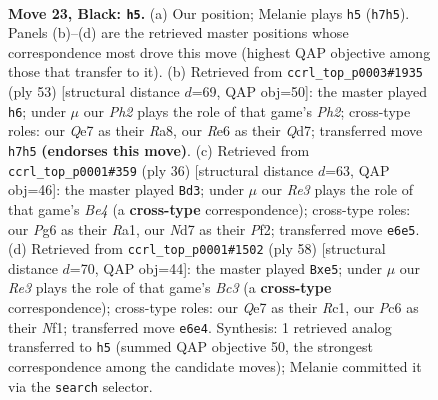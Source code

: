 \documentclass[11pt]{article}
\begin{document}
\clearpage

\begin{figure}[p]\centering
\begin{subfigure}{0.46\textwidth}\centering
\resizebox{\linewidth}{!}{%
\newchessgame
\chessboard[
  setfen={r1b5/pp1nq1kp/2p1r1p1/6p1/2BPN3/5PP1/PP5P/2RQR1K1 b - - 2 23},
  showmover=false,
  pgfstyle=straightmove, color=movearrow, markmove={h7-h5}
]}
\caption{}
\end{subfigure}\hfill
\begin{subfigure}{0.46\textwidth}\centering
\resizebox{\linewidth}{!}{%
\newchessgame
\chessboard[
  setfen={r5k1/3q2pp/pBNp4/3Pp1b1/Q3P2r/7n/1PP4P/1K2R2R b - - 4 27},
  showmover=false,
  pgfstyle=straightmove, color=movearrow, markmove={h7-h6}
]}
\caption{}
\end{subfigure}
\\[4pt]
\begin{subfigure}{0.46\textwidth}\centering
\resizebox{\linewidth}{!}{%
\newchessgame
\chessboard[
  setfen={r4r1k/p1q2pp1/b1n1p2p/2p5/P3B3/2P1PNP1/2Q2PP1/R4RK1 w - - 6 19},
  showmover=false,
  pgfstyle=straightmove, color=movearrow, markmove={e4-d3}
]}
\caption{}
\end{subfigure}\hfill
\begin{subfigure}{0.46\textwidth}\centering
\resizebox{\linewidth}{!}{%
\newchessgame
\chessboard[
  setfen={3rr1k1/pp4p1/3bq2p/4np2/4p3/P1B1P2P/1P2QPP1/2RR1NK1 w - - 2 30},
  showmover=false,
  pgfstyle=straightmove, color=movearrow, markmove={c3-e5}
]}
\caption{}
\end{subfigure}
\caption{\textbf{Move 23, Black: \texttt{h5}.} (a) Our position; Melanie plays \texttt{h5} (\texttt{h7h5}). Panels (b)--(d) are the retrieved master positions whose correspondence most drove this move (highest QAP objective among those that transfer to it). (b) Retrieved from \texttt{ccrl\_top\_p0003\#1935} (ply 53) [structural distance $d$=69, QAP obj=50]: the master played \texttt{h6}; under $\mu$ our \emph{Ph2} plays the role of that game's \emph{Ph2}; cross-type roles: our \emph{Q}e7 as their \emph{R}a8, our \emph{R}e6 as their \emph{Q}d7; transferred move \texttt{h7h5} \textbf{(endorses this move)}. (c) Retrieved from \texttt{ccrl\_top\_p0001\#359} (ply 36) [structural distance $d$=63, QAP obj=46]: the master played \texttt{Bd3}; under $\mu$ our \emph{Re3} plays the role of that game's \emph{Be4} (a \textbf{cross-type} correspondence); cross-type roles: our \emph{P}g6 as their \emph{R}a1, our \emph{N}d7 as their \emph{P}f2; transferred move \texttt{e6e5}. (d) Retrieved from \texttt{ccrl\_top\_p0001\#1502} (ply 58) [structural distance $d$=70, QAP obj=44]: the master played \texttt{Bxe5}; under $\mu$ our \emph{Re3} plays the role of that game's \emph{Bc3} (a \textbf{cross-type} correspondence); cross-type roles: our \emph{Q}e7 as their \emph{R}c1, our \emph{P}c6 as their \emph{N}f1; transferred move \texttt{e6e4}. Synthesis: 1 retrieved analog transferred to \texttt{h5} (summed QAP objective 50, the strongest correspondence among the candidate moves); Melanie committed it via the \texttt{search} selector.}
\label{fig:thought-m45}
\end{figure}
\end{document}
